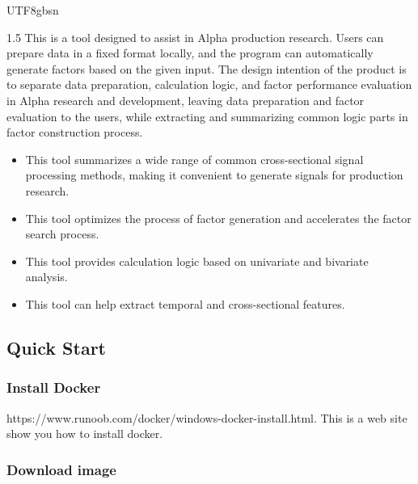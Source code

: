 \documentclass{article}
\begin{document}
\begin{CJK}{UTF8}{gbsn}
\begin{spacing}{1.5}
This is a tool designed to assist in Alpha production research. Users can prepare data in a fixed format locally, and the program can automatically generate factors based on the given input. The design intention of the product is to separate data preparation, calculation logic, and factor performance evaluation in Alpha research and development, leaving data preparation and factor evaluation to the users, while extracting and summarizing common logic parts in factor construction process.



\begin{itemize}
\item[*] This tool summarizes a wide range of common cross-sectional signal processing methods, making it convenient to generate signals for production research.
\item[*] This tool optimizes the process of factor generation and accelerates the factor search process.
\item[*] This tool provides calculation logic based on univariate and bivariate analysis. 
\item[*] This tool can help extract temporal and cross-sectional features.

\end{itemize}

\subsection{Quick Start}

\subsubsection{Install Docker}
https://www.runoob.com/docker/windows-docker-install.html. This is a web site show you how to install docker.
\subsubsection{Download image}

%


\end{spacing}
\end{CJK}
\end{document}
